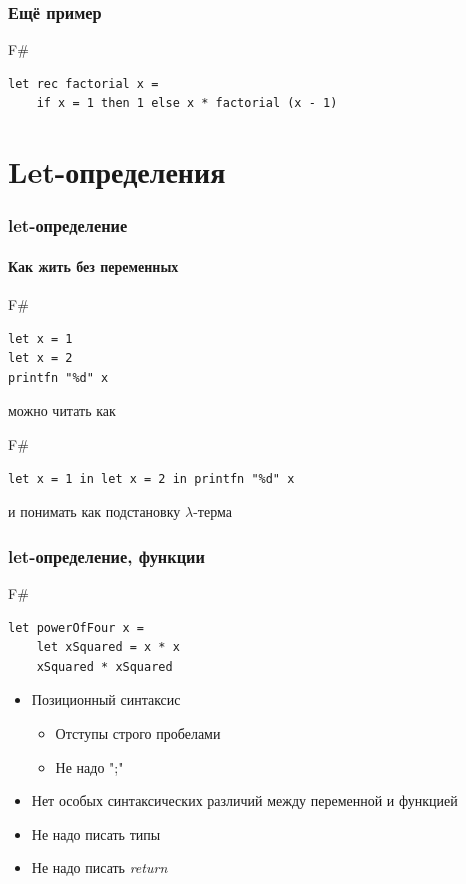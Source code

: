 \documentclass[xetex,mathserif,serif]{beamer}
\begin{document}
	\begin{frame}[fragile]
		\frametitle{Ещё пример}
		\begin{exampleblock}{F\#}
			\begin{verbatim}
let rec factorial x =
    if x = 1 then 1 else x * factorial (x - 1)
			\end{verbatim}
		\end{exampleblock}
\end{frame}
	
	\section{Let-определения}

	\begin{frame}[fragile]
		\frametitle{let-определение}
		\framesubtitle{Как жить без переменных}
		\begin{exampleblock}{F\#}
			\begin{verbatim}
let x = 1
let x = 2
printfn "%d" x
			\end{verbatim}
		\end{exampleblock}
		можно читать как
		\begin{exampleblock}{F\#}
			\begin{verbatim}
let x = 1 in let x = 2 in printfn "%d" x
			\end{verbatim}
		\end{exampleblock}
		и понимать как подстановку $\lambda$-терма
\end{frame}
		
	\begin{frame}[fragile]
		\frametitle{let-определение, функции}
		\begin{exampleblock}{F\#}
			\begin{verbatim}
let powerOfFour x = 
    let xSquared = x * x
    xSquared * xSquared
			\end{verbatim}
		\end{exampleblock}
		\begin{itemize}
			\item Позиционный синтаксис
			\begin{itemize}
				\item Отступы строго пробелами
				\item Не надо ";"
			\end{itemize}
			\item Нет особых синтаксических различий между переменной и функцией
			\item Не надо писать типы
			\item Не надо писать \textit{return}
		\end{itemize}
\end{frame}
\end{document}
